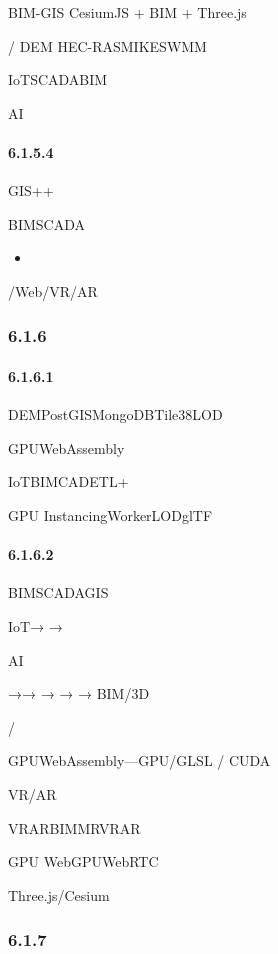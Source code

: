 BIM-GIS CesiumJS + BIM + Three.js

/ DEM HEC-RASMIKESWMM

IoTSCADABIM

AI

\hypertarget{section-40}{%
\paragraph{6.1.5.4}\label{section-40}}

GIS++

BIMSCADA

\begin{itemize}
\tightlist
\item
\end{itemize}

/Web/VR/AR

\hypertarget{section-41}{%
\subsubsection{6.1.6}\label{section-41}}

\hypertarget{section-42}{%
\paragraph{6.1.6.1}\label{section-42}}

DEMPostGISMongoDBTile38LOD

GPUWebAssembly

IoTBIMCADETL+

GPU InstancingWorkerLODglTF

\hypertarget{section-43}{%
\paragraph{6.1.6.2}\label{section-43}}

BIMSCADAGIS

IoT→ →

AI

→→ → → → BIM/3D

/

GPUWebAssembly---GPU/GLSL / CUDA

VR/AR

VRARBIMMRVRAR

GPU WebGPUWebRTC

Three.js/Cesium

\hypertarget{section-44}{%
\subsubsection{6.1.7}\label{section-44}}

